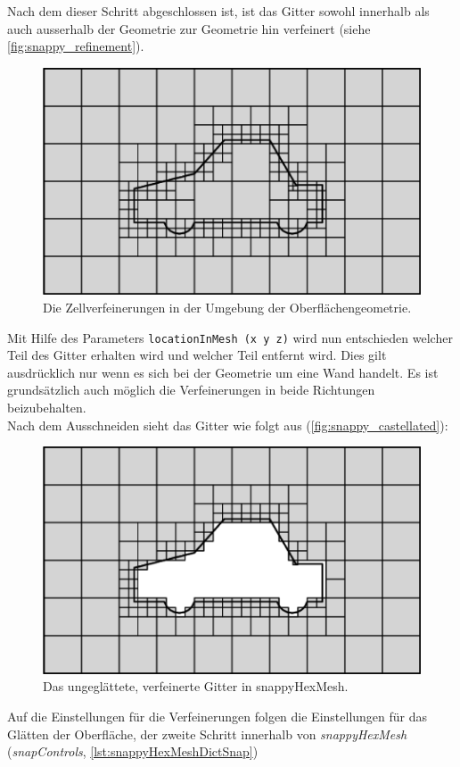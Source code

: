 Nach dem dieser Schritt abgeschlossen ist, ist das Gitter sowohl innerhalb als auch ausserhalb der Geometrie zur Geometrie hin verfeinert (siehe \autoref{fig:snappy_refinement}). 

\begin{figure}
\centering
\includegraphics[width=0.7\linewidth]{Abbildungen/snappy_refinement}
\caption[Zellverfeinerung snappyHexMesh]{Die Zellverfeinerungen in der Umgebung der Oberflächengeometrie.}
\label{fig:snappy_refinement}
\end{figure}

Mit Hilfe des Parameters \texttt{locationInMesh (x y z)} wird nun entschieden welcher Teil des Gitter erhalten wird und welcher Teil entfernt wird. Dies gilt ausdrücklich nur wenn es sich bei der Geometrie um eine Wand handelt. Es ist grundsätzlich auch möglich die Verfeinerungen in beide Richtungen beizubehalten. 
\\
Nach dem Ausschneiden sieht das Gitter wie folgt aus (\autoref{fig:snappy_castellated}):

\begin{figure}
\centering
\includegraphics[width=0.7\linewidth]{Abbildungen/snappy_castellated}
\caption[Ungeglättetes, verfeinertes Gitter in snappyHexMesh]{Das ungeglättete, verfeinerte Gitter in snappyHexMesh.}
\label{fig:snappy_castellated}
\end{figure}

Auf die Einstellungen für die Verfeinerungen folgen die Einstellungen für das Glätten der Oberfläche, der zweite Schritt innerhalb von \textit{snappyHexMesh} (\textit{snapControls}, \autoref{lst:snappyHexMeshDictSnap})

